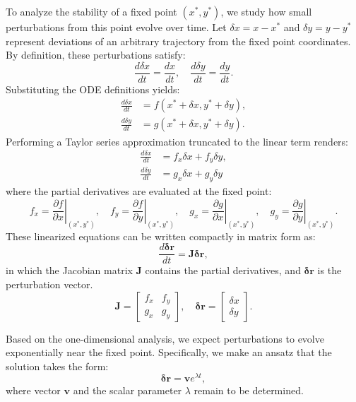 To analyze the stability of a fixed point $(x^*, y^*)$, we study how small perturbations from this point evolve over time. Let $\delta x = x - x^*$ and $\delta y = y - y^*$ represent deviations of an arbitrary trajectory from the fixed point coordinates. By definition, these perturbations satisfy:
\begin{equation*}
\frac{d \delta x}{dt} = \frac{dx}{dt}, \quad
\frac{d \delta y}{dt} = \frac{dy}{dt}.
\end{equation*}
Substituting the ODE definitions yields:
\begin{align*}
\frac{d \delta x}{dt} &= f(x^* + \delta x, y^* + \delta y), \\
\frac{d \delta y}{dt} &= g(x^* + \delta x, y^* + \delta y).
\end{align*}
Performing a Taylor series approximation truncated to the linear term renders:
\begin{align*}
\frac{d\delta x}{dt} &= f_x \delta x + f_y \delta y,\\
\frac{d\delta y}{dt} &= g_x \delta x + g_y \delta y
\end{align*}
where the partial derivatives are evaluated at the fixed point:
\begin{equation*}
f_x = \left. \frac{\partial f}{\partial x}\right|_{(x^*,y^*)}, \quad
f_y = \left. \frac{\partial f}{\partial y}\right|_{(x^*,y^*)}, \quad
g_x = \left. \frac{\partial g}{\partial x}\right|_{(x^*,y^*)}, \quad
g_y = \left. \frac{\partial g}{\partial y}\right|_{(x^*,y^*)}. 
\end{equation*}
These linearized equations can be written compactly in matrix form as:
\begin{equation}
    \frac{d \mathbf{\delta r}}{dt} = \mathbf{J} \mathbf{\delta r}, \label{eq:11.03}
\end{equation}
in which the Jacobian matrix $\mathbf{J}$ contains the partial derivatives, and $\mathbf{\delta r}$ is the perturbation vector.
\begin{equation*}
\mathbf{J} =
\begin{bmatrix}
f_x  & f_y \\
g_x  & g_y
\end{bmatrix},
\quad
\mathbf{\delta r} = \begin{bmatrix}
\delta x \\
\delta y
\end{bmatrix}.
\end{equation*}

Based on the one-dimensional analysis, we expect perturbations to evolve exponentially near the fixed point. Specifically, we make an ansatz that the solution takes the form:
\begin{equation}
    \mathbf{\delta r} = \mathbf{v} e^{\lambda t}, \label{eq:11.04}
\end{equation}
where vector $\mathbf{v}$ and the scalar parameter $\lambda$ remain to be determined. 

